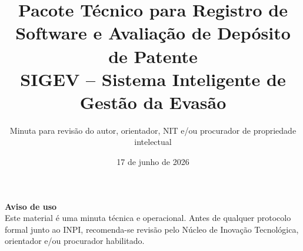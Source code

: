 \documentclass[12pt,a4paper]{article}
\title{Pacote Técnico para Registro de Software e Avaliação de Depósito de Patente\\
\large SIGEV -- Sistema Inteligente de Gestão da Evasão}
\author{Minuta para revisão do autor, orientador, NIT e/ou procurador de propriedade intelectual}
\date{17 de junho de 2026}
\begin{document}
\maketitle

\begin{center}
\textbf{Aviso de uso}\\
Este material é uma minuta técnica e operacional. Antes de qualquer protocolo formal junto ao INPI, recomenda-se revisão pelo Núcleo de Inovação Tecnológica, orientador e/ou procurador habilitado.
\end{center}

\tableofcontents
\newpage


\newpage

\newpage

\newpage

\newpage

\newpage

\newpage

\end{document}
